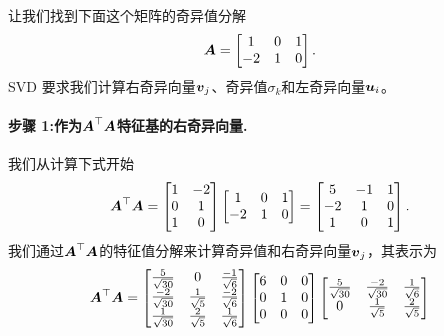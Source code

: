 \begin{example}[计算SVD]
让我们找到下面这个矩阵的奇异值分解
\begin{equation}
    \boldsymbol{A} =
    \begin{bmatrix}
        1 & 0 & 1 \\
        -2 & 1 & 0
    \end{bmatrix}.
\end{equation}
SVD 要求我们计算右奇异向量$\boldsymbol{v}_j$、奇异值$\sigma_k$和左奇异向量$\boldsymbol{u}_i$。
\paragraph{步骤 1:作为$\boldsymbol{A}^\top\boldsymbol{A}$特征基的右奇异向量.}
我们从计算下式开始
\begin{equation}
    \boldsymbol{A}^\top\boldsymbol{A} =
    \begin{bmatrix}
        1 & -2 \\
        0 & 1 \\
        1 & 0
    \end{bmatrix}
    \begin{bmatrix}
        1 & 0 & 1 \\
        -2 & 1 & 0
    \end{bmatrix} =
    \begin{bmatrix}
        5 & -1 & 1 \\
        -2 & 1 & 0 \\
        1 & 0 & 1
    \end{bmatrix}.
\end{equation}
我们通过$\boldsymbol{A}^\top\boldsymbol{A}$的特征值分解来计算奇异值和右奇异向量$\boldsymbol{v}_j$，其表示为
\begin{equation}
    \boldsymbol{A}^\top\boldsymbol{A} =
    \begin{bmatrix}
        \frac{5}{\sqrt{30}} & 0 & \frac{-1}{\sqrt{6}} \\
        \frac{-2}{\sqrt{30}} & \frac{1}{\sqrt{5}} & \frac{-2}{\sqrt{6}} \\
        \frac{1}{\sqrt{30}} & \frac{2}{\sqrt{5}} & \frac{1}{\sqrt{6}}
    \end{bmatrix}
    \begin{bmatrix}
        6 & 0 & 0 \\
        0 & 1 & 0 \\
        0 & 0 & 0 \\
    \end{bmatrix}
    \begin{bmatrix}
        \frac{5}{\sqrt{30}} & \frac{-2}{\sqrt{30}} & \frac{1}{\sqrt{6}} \\
        0 & \frac{1}{\sqrt{5}} & \frac{2}{\sqrt{5}} \\

\end{bmatrix}
\end{equation}
\end{example}
